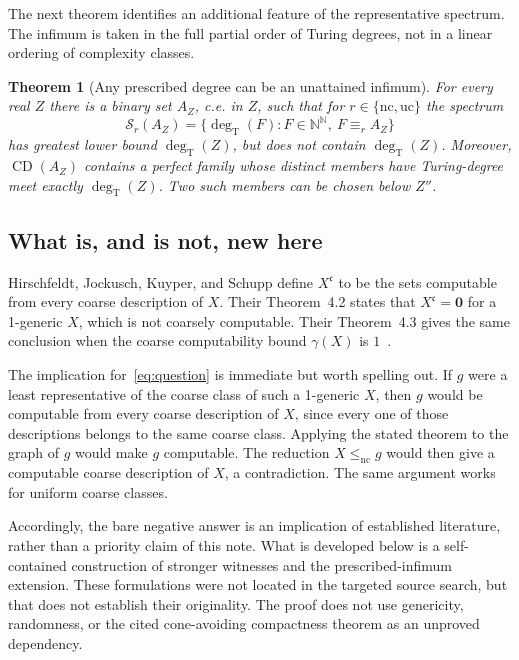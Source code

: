 \documentclass[11pt,a4paper]{article}
\newcommand{\N}{\mathbb N}
\newcommand{\Baire}{\N^{\N}}
\newcommand{\degT}{\operatorname{deg}_{\mathrm T}}
\newcommand{\CD}{\operatorname{CD}}
\newcommand{\nc}{\mathrm{nc}}
\newcommand{\uc}{\mathrm{uc}}
\newcommand{\Spec}{\mathcal S}
\newcommand{\zerodeg}{\mathbf 0}
\newtheorem{theorem}{Theorem}[section]
\theoremstyle{definition}
\theoremstyle{remark}
\begin{document}
The next theorem identifies an additional feature of the representative
spectrum. The infimum is taken in the full partial order of Turing degrees,
not in a linear ordering of complexity classes.

\begin{theorem}[Any prescribed degree can be an unattained infimum]
\label{thm:infimum}
For every real $Z$ there is a binary set $A_Z$, c.e. in $Z$, such that for
$r\in\{\nc,\uc\}$ the spectrum
\[
 \Spec_r(A_Z)=\{\degT(F):F\in\Baire,\ F\equiv_r A_Z\}
\]
has greatest lower bound $\degT(Z)$, but does not contain $\degT(Z)$.
Moreover, $\CD(A_Z)$ contains a perfect family whose distinct members have
Turing-degree meet exactly $\degT(Z)$. Two such members can be chosen below
$Z''$.
\end{theorem}

\subsection{What is, and is not, new here}
Hirschfeldt, Jockusch, Kuyper, and Schupp define $X^{\mathfrak c}$ to be the
sets computable from every coarse description of $X$. Their Theorem~4.2
states that $X^{\mathfrak c}=\zerodeg$ for a 1-generic $X$, which is not
coarsely computable. Their Theorem~4.3 gives the same conclusion when the
coarse computability bound $\gamma(X)$ is $1$~\cite{HJKS}.

The implication for~\eqref{eq:question} is immediate but worth spelling out.
If $g$ were a least representative of the coarse class of such a 1-generic
$X$, then $g$ would be computable from every coarse description of $X$,
since every one of those descriptions belongs to the same coarse class.
Applying the stated theorem to the graph of $g$ would make $g$ computable.
The reduction $X\le_{\nc}g$ would then give a computable coarse description
of $X$, a contradiction. The same argument works for uniform coarse classes.

Accordingly, the bare negative answer is an implication of established
literature, rather than a priority claim of this note. What is developed
below is a self-contained construction of stronger witnesses and the
prescribed-infimum extension. These formulations were not located in the
targeted source search, but that does not establish their originality.
The proof does not use genericity, randomness, or the cited cone-avoiding
compactness theorem as an unproved dependency.
\end{document}
